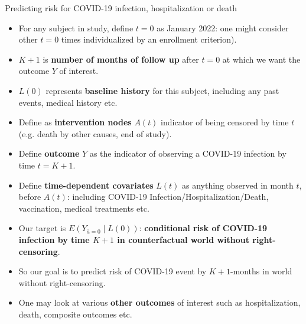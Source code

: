 \documentclass[t]{beamer}
\begin{document}
\begin{frame}{Predicting risk for COVID-19 infection, hospitalization or death}

\begin{itemize}
\item For any subject in study, define $t=0$ as January 2022: one might consider other $t=0$ times individualized by an enrollment criterion).
\item $K+1$ is {\bf number of months of follow up} after $t=0$ at which we want the outcome $Y$  of interest.
\item $L(0)$ represents {\bf baseline history} for this subject, including any past events, medical history etc.
\item Define as {\bf intervention nodes} $A(t)$ indicator of being censored by time $t$ (e.g. death by other causes, end of study).
\item Define {\bf outcome} $Y$ as the indicator of observing a COVID-19 infection by time  $t=K+1$.
\item Define {\bf time-dependent covariates} $L(t)$ as anything observed in month $t$, before $A(t)$: including COVID-19 Infection/Hospitalization/Death, vaccination, medical treatments etc.
\end{itemize}
\end{frame}
\begin{frame}
\begin{itemize}
\item Our target is $E(Y_{\bar{a}=0}\mid L(0))$: {\bf conditional risk of COVID-19 infection by time $K+1$ in counterfactual world without right-censoring}. 
\item So our goal is to predict risk of COVID-19 event by $K+1$-months in world without right-censoring. 
\item One  may look at various {\bf other outcomes} of interest such as hospitalization, death, composite outcomes etc. 
\end{itemize}
\end{frame}
\end{document}
